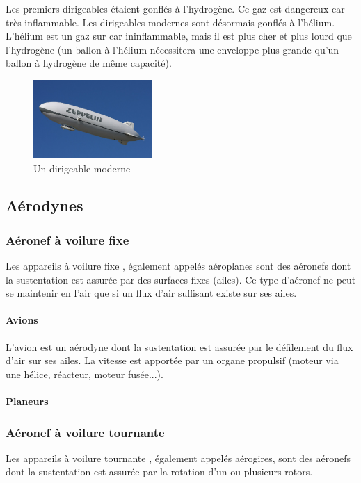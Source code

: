 	Les premiers dirigeables étaient gonflés à l'hydrogène. Ce gaz est dangereux car très inflammable. Les dirigeables modernes sont désormais gonflés à l'hélium. L'hélium est un gaz sur car ininflammable, mais il est plus cher et plus lourd que l'hydrogène (un ballon à l'hélium nécessitera une enveloppe plus grande qu'un ballon à hydrogène de même capacité).
	
	\begin{figure}[H]
  	\centering
    \includegraphics[width=0.4\textwidth]{1-EtudeAeronefs/img/dirigeable.jpg}
  	\caption{Un dirigeable moderne \cite{img:dirigeable}}
	\end{figure}	

\subsection{Aérodynes}
	\subsubsection{Aéronef à voilure fixe}
		Les appareils à voilure fixe , également appelés aéroplanes sont des aéronefs dont la sustentation est assurée par des surfaces fixes (ailes). Ce type d'aéronef ne peut se maintenir en l'air que si un flux d'air suffisant existe sur ses ailes.

		\paragraph{Avions}
		L'avion est un aérodyne dont la sustentation est assurée par le défilement du flux d'air sur ses ailes. La vitesse est apportée par un organe propulsif (moteur via une hélice, réacteur, moteur fusée...).
	
		\paragraph{Planeurs}
		
	\subsubsection{Aéronef à voilure tournante}
	Les appareils à voilure tournante , également appelés aérogires, sont des aéronefs dont la sustentation est assurée par la rotation d'un ou plusieurs rotors.
